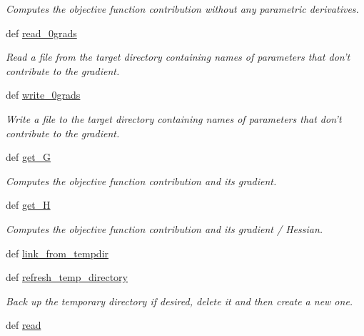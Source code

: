\begin{DoxyCompactItemize}
\begin{DoxyCompactList}\small\item\em Computes the objective function contribution without any parametric derivatives. \end{DoxyCompactList}\item 
def \hyperlink{classforcebalance_1_1target_1_1Target_a09bb0e8350a17974c908a9728b2709bf}{read\-\_\-0grads}
\begin{DoxyCompactList}\small\item\em Read a file from the target directory containing names of parameters that don't contribute to the gradient. \end{DoxyCompactList}\item 
def \hyperlink{classforcebalance_1_1target_1_1Target_acc7601caa4b719bf7e31961c2eb30dd7}{write\-\_\-0grads}
\begin{DoxyCompactList}\small\item\em Write a file to the target directory containing names of parameters that don't contribute to the gradient. \end{DoxyCompactList}\item 
def \hyperlink{classforcebalance_1_1target_1_1Target_afa8cc38c8bba8861c072e789717aa049}{get\-\_\-\-G}
\begin{DoxyCompactList}\small\item\em Computes the objective function contribution and its gradient. \end{DoxyCompactList}\item 
def \hyperlink{classforcebalance_1_1target_1_1Target_a1d2ee27fe86a09769c1816af23b09adb}{get\-\_\-\-H}
\begin{DoxyCompactList}\small\item\em Computes the objective function contribution and its gradient / Hessian. \end{DoxyCompactList}\item 
def \hyperlink{classforcebalance_1_1target_1_1Target_a5aa4958cea0a48138511567a076c5a82}{link\-\_\-from\-\_\-tempdir}
\item 
def \hyperlink{classforcebalance_1_1target_1_1Target_afe815eafab06ac92f10bbf4b88ad95c8}{refresh\-\_\-temp\-\_\-directory}
\begin{DoxyCompactList}\small\item\em Back up the temporary directory if desired, delete it and then create a new one. \end{DoxyCompactList}\item 
def \hyperlink{classforcebalance_1_1target_1_1Target_afb87b4d33b88bb381c74b76752c5892a}{read}

\end{DoxyCompactItemize}
